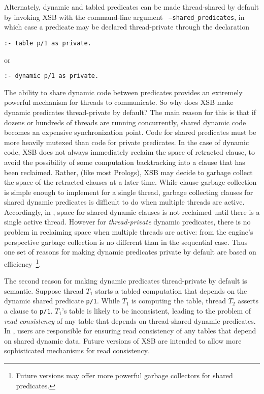 %
Alternately, dynamic and tabled predicates can be made thread-shared
by default by invoking XSB with the command-line argument {\tt
  --shared\_predicates}, in which case a predicate may be declared
thread-private through the declaration
%
\begin{verbatim}
:- table p/1 as private.
\end{verbatim}
or 
\begin{verbatim}
:- dynamic p/1 as private.
\end{verbatim}

%

The ability to share dynamic code between predicates provides an
extremely powerful mechanism for threads to communicate.  So why does
XSB make dynamic predicates thread-private by default?  The main
reason for this is that if dozens or hundreds of threads are running
concurrently, shared dynamic code becomes an expensive synchronization
point.  Code for shared predicates must be more heavily mutexed than
code for private predicates.  In the case of dynamic code, XSB does
not always immediately reclaim the space of retracted clause, to avoid
the possibility of some computation backtracking into a clause that
has been reclaimed.  Rather, (like most Prologs), XSB may decide to
garbage collect the space of the retracted clauses at a later time.
While clause garbage collection is simple enough to implement for a
single thread, garbage collecting clauses for shared dynamic
predicates is difficult to do when multiple threads are active.
Accordingly, in \version , space for shared dynamic clauses is not
reclaimed until there is a single active thread.  However for {\em
  thread-private} dynamic predicates, there is no problem in
reclaiming space when multiple threads are active: from the engine's
perspective garbage collection is no different than in the sequential
case.  Thus one set of reasons for making dynamic predicates private
by default are based on efficiency~\footnote{Future versions may offer
  more powerful garbage collectors for shared predicates.}.

The second reason for making dynamic predicates thread-private by
default is semantic.  Suppose thread $T_1$ starts a tabled computation
that depends on the dynamic shared predicate {\tt p/1}.  While $T_1$
is computing the table, thread $T_2$ asserts a clause to {\tt p/1}.
$T_1$'s table is likely to be inconsistent, leading to the problem of
{\em read consistency} of any table that depends on thread-shared
dynamic predicates.  In \version , users are responsible for ensuring
read consistency of any tables that depend on shared dynamic data.
Future versions of XSB are intended to allow more sophisticated
mechanisms for read consistency.

